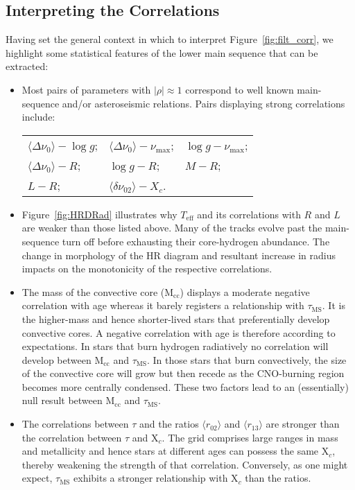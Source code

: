 \subsection{Interpreting the Correlations}
Having set the general context in which to interpret Figure~\ref{fig:filt_corr}, we highlight some statistical features of the lower main sequence that can be extracted: 

\begin{itemize}
\item Most pairs of parameters with ${| \rho | \approx 1}$ correspond to well known main-sequence and/or asteroseismic relations. Pairs displaying strong correlations include:

%
%
%
%
%
\begin{tabular}{lll}
  $\langle\Delta\nu_0\rangle  -  \log{} g$; 
& $\langle\Delta\nu_0\rangle - \nu_{\max}$; 
& $\log{} g - \nu_{\max}$;  \\
  $\langle\Delta\nu_0\rangle - R$; 
& $\log{} g - R$; 
& $M  -  R$;  \\
  $L - R$; 
& $\langle\delta\nu_{02}\rangle - X_c$. 
&
\end{tabular}

\item Figure~\ref{fig:HRDRad} illustrates why $T_{\text{eff}}$ and its correlations with $R$ and $L$ are weaker than those listed above. 
Many of the tracks evolve past the main-sequence turn off before exhausting their core-hydrogen abundance. The change in morphology of the HR diagram and resultant increase in radius impacts on the monotonicity of the respective correlations. 

 

\item The mass of the convective core (M$_{\text{cc}}$) displays a moderate negative correlation with age whereas it barely registers a relationship with $\tau_{\text{MS}}$. 
It is the higher-mass and hence shorter-lived stars that preferentially develop convective cores. A negative correlation with age is therefore according to expectations.  
In stars that burn hydrogen radiatively no correlation will develop between M$_{\text{cc}}$ and $\tau_{\text{MS}}$. 
In those stars that burn convectively, the size of the convective core will grow but then recede as the CNO-burning region becomes more centrally condensed. 
These two factors lead to an (essentially) null result between M$_{\text{cc}}$ and $\tau_{\text{MS}}$. 


\item The correlations between $\tau$ and the ratios ${\langle r_{02}\rangle}$ and ${\langle r_{13}\rangle}$ are stronger than the correlation between $\tau$ and  X$_c$. 
The grid comprises large ranges in mass and metallicity and hence stars at different ages can possess the same X$_c$, thereby weakening the strength of that correlation.
Conversely, as one might expect,  $\tau_{\text{MS}}$ exhibits a stronger relationship with X$_c$ than the ratios. 


\end{itemize}
